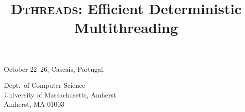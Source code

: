\documentclass[9pt]{sigplanconf}
\date{} %
\newcommand{\punt}[1]{}
\newcommand{\dthreads}{{\scshape Dthreads}}
\begin{document}
 {October 22--26, Cascais, Portugal.}

\title{{\huge \bf \dthreads{}}: Efficient Deterministic Multithreading}


{Dept.\ of Computer Science \\
University of Massachusetts, Amherst \\
Amherst, MA 01003}

\punt{
\numberofauthors{1}
\author{
\alignauthor Tongping~Liu, Charlie~Curtsinger, and Emery~D.~Berger \\
\affaddr{Department of Computer Science} \\
\affaddr{University of Massachusetts, Amherst} \\
\affaddr{Amherst, MA 01003} \\
\email{\{tonyliu,charlie,emery\}@cs.umass.edu} \\
}
}

\maketitle

\begin{comment}
\end{comment}
\end{document}
